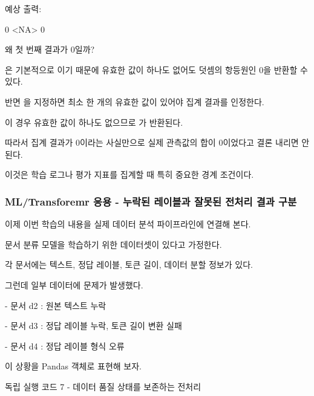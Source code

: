 예상 출력:

\begin{dhkzsh}
0
<NA>
0
\end{dhkzsh}

왜 첫 번째 결과가 0일까?

은 기본적으로 이기 때문에 유효한 값이 하나도 없어도 덧셈의 항등원인 0을 반환할 수 있다.

반면 을 지정하면 최소 한 개의 유효한 값이 있어야 집계 결과를 인정한다.

이 경우 유효한 값이 하나도 없으므로 가 반환된다.

따라서 집계 결과가 0이라는 사실만으로 실제 관측값의 합이 0이었다고 결론 내리면 안 된다.

이것은 학습 로그나 평가 지표를 집계할 때 특히 중요한 경계 조건이다.

\subsubsection{ML/Transforemr 응용 - 누락된 레이블과 잘못된 전처리 결과 구분}

이제 이번 학습의 내용을 실제 데이터 분석 파이프라인에 연결해 본다.

문서 분류 모델을 학습하기 위한 데이터셋이 있다고 가정한다.

각 문서에는 텍스트, 정답 레이블, 토큰 길이, 데이터 분할 정보가 있다.

그런데 일부 데이터에 문제가 발생했다.

\begin{dhksmry}
    - 문서 d2 : 원본 텍스트 누락

    - 문서 d3 : 정답 레이블 누락, 토큰 길이 변환 실패

    - 문서 d4 : 정답 레이블 형식 오류
\end{dhksmry}

이 상황을 Pandas 객체로 표현해 보자.

\begin{dhknote}
\begin{dhksmry}[centered]
독립 실행 코드 7 - 데이터 품질 상태를 보존하는 전처리
\end{dhksmry}
\end{dhknote}

